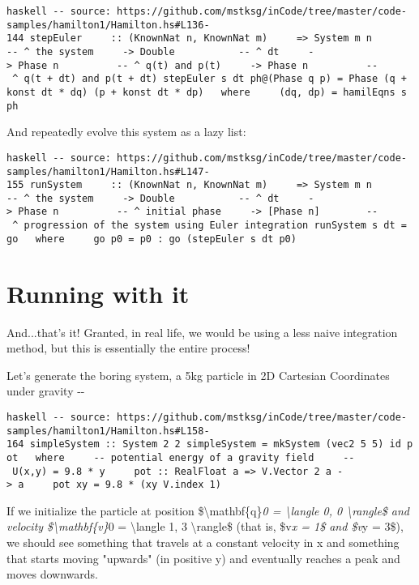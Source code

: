 \documentclass[]{article}
\begin{document}
\texttt{haskell\ -\/-\ source:\ https://github.com/mstksg/inCode/tree/master/code-samples/hamilton1/Hamilton.hs\#L136-144\ stepEuler\ \ \ \ \ ::\ (KnownNat\ n,\ KnownNat\ m)\ \ \ \ \ =\textgreater{}\ System\ m\ n\ \ \ \ \ \ \ -\/-\ \^{}\ the\ system\ \ \ \ \ -\textgreater{}\ Double\ \ \ \ \ \ \ \ \ \ \ -\/-\ \^{}\ dt\ \ \ \ \ -\textgreater{}\ Phase\ n\ \ \ \ \ \ \ \ \ \ -\/-\ \^{}\ q(t)\ and\ p(t)\ \ \ \ \ -\textgreater{}\ Phase\ n\ \ \ \ \ \ \ \ \ \ -\/-\ \^{}\ q(t\ +\ dt)\ and\ p(t\ +\ dt)\ stepEuler\ s\ dt\ ph@(Phase\ q\ p)\ =\ Phase\ (q\ +\ konst\ dt\ *\ dq)\ (p\ +\ konst\ dt\ *\ dp)\ \ \ where\ \ \ \ \ (dq,\ dp)\ =\ hamilEqns\ s\ ph}

And repeatedly evolve this system as a lazy list:

\texttt{haskell\ -\/-\ source:\ https://github.com/mstksg/inCode/tree/master/code-samples/hamilton1/Hamilton.hs\#L147-155\ runSystem\ \ \ \ \ ::\ (KnownNat\ n,\ KnownNat\ m)\ \ \ \ \ =\textgreater{}\ System\ m\ n\ \ \ \ \ \ \ -\/-\ \^{}\ the\ system\ \ \ \ \ -\textgreater{}\ Double\ \ \ \ \ \ \ \ \ \ \ -\/-\ \^{}\ dt\ \ \ \ \ -\textgreater{}\ Phase\ n\ \ \ \ \ \ \ \ \ \ -\/-\ \^{}\ initial\ phase\ \ \ \ \ -\textgreater{}\ {[}Phase\ n{]}\ \ \ \ \ \ \ \ -\/-\ \^{}\ progression\ of\ the\ system\ using\ Euler\ integration\ runSystem\ s\ dt\ =\ go\ \ \ where\ \ \ \ \ go\ p0\ =\ p0\ :\ go\ (stepEuler\ s\ dt\ p0)}

\section{Running with it}

And...that's it! Granted, in real life, we would be using a less naive
integration method, but this is essentially the entire process!

Let's generate the boring system, a 5kg particle in 2D Cartesian Coordinates
under gravity -\/-

\texttt{haskell\ -\/-\ source:\ https://github.com/mstksg/inCode/tree/master/code-samples/hamilton1/Hamilton.hs\#L158-164\ simpleSystem\ ::\ System\ 2\ 2\ simpleSystem\ =\ mkSystem\ (vec2\ 5\ 5)\ id\ pot\ \ \ where\ \ \ \ \ -\/-\ potential\ energy\ of\ a\ gravity\ field\ \ \ \ \ -\/-\ U(x,y)\ =\ 9.8\ *\ y\ \ \ \ \ pot\ ::\ RealFloat\ a\ =\textgreater{}\ V.Vector\ 2\ a\ -\textgreater{}\ a\ \ \ \ \ pot\ xy\ =\ 9.8\ *\ (xy\ \textasciigrave{}V.index\textasciigrave{}\ 1)}

If we initialize the particle at position \$\textbackslash{}mathbf\{q\}\emph{0 =
\textbackslash{}langle 0, 0 \textbackslash{}rangle\$ and velocity
\$\textbackslash{}mathbf\{v\}}0 = \textbackslash{}langle 1, 3
\textbackslash{}rangle\$ (that is, \$v\emph{x = 1\$ and \$v}y = 3\$), we should
see something that travels at a constant velocity in x and something that starts
moving "upwards" (in positive y) and eventually reaches a peak and moves
downwards.
\end{document}
